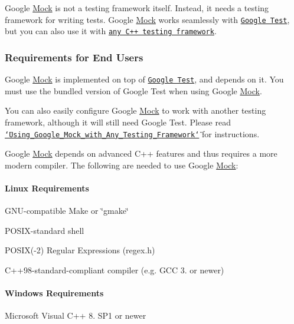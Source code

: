 Google \hyperlink{class_mock}{Mock} is not a testing framework itself. Instead, it needs a testing framework for writing tests. Google \hyperlink{class_mock}{Mock} works seamlessly with \href{http://code.google.com/p/googletest/}{\tt Google Test}, but you can also use it with \href{googlemock/ForDummies.md#Using_Google_Mock_with_Any_Testing_Framework}{\tt any C++ testing framework}.

\subsubsection*{Requirements for End Users}

Google \hyperlink{class_mock}{Mock} is implemented on top of \href{http://github.com/google/googletest/}{\tt Google Test}, and depends on it. You must use the bundled version of Google Test when using Google \hyperlink{class_mock}{Mock}.

You can also easily configure Google \hyperlink{class_mock}{Mock} to work with another testing framework, although it will still need Google Test. Please read \href{docs/ForDummies.md#Using_Google_Mock_with_Any_Testing_Framework}{\tt \char`\"{}\+Using\+\_\+\+Google\+\_\+\+Mock\+\_\+with\+\_\+\+Any\+\_\+\+Testing\+\_\+\+Framework\char`\"{}} for instructions.

Google \hyperlink{class_mock}{Mock} depends on advanced C++ features and thus requires a more modern compiler. The following are needed to use Google \hyperlink{class_mock}{Mock}\+:

\paragraph*{Linux Requirements}


\begin{DoxyItemize}
\item G\+N\+U-\/compatible Make or \char`\"{}gmake\char`\"{}
\item P\+O\+S\+I\+X-\/standard shell
\item P\+O\+S\+IX(-\/2) Regular Expressions (regex.\+h)
\item C++98-\/standard-\/compliant compiler (e.\+g. G\+CC 3. or newer)
\end{DoxyItemize}

\paragraph*{Windows Requirements}


\begin{DoxyItemize}
\item Microsoft Visual C++ 8. S\+P1 or newer
\end{DoxyItemize}

